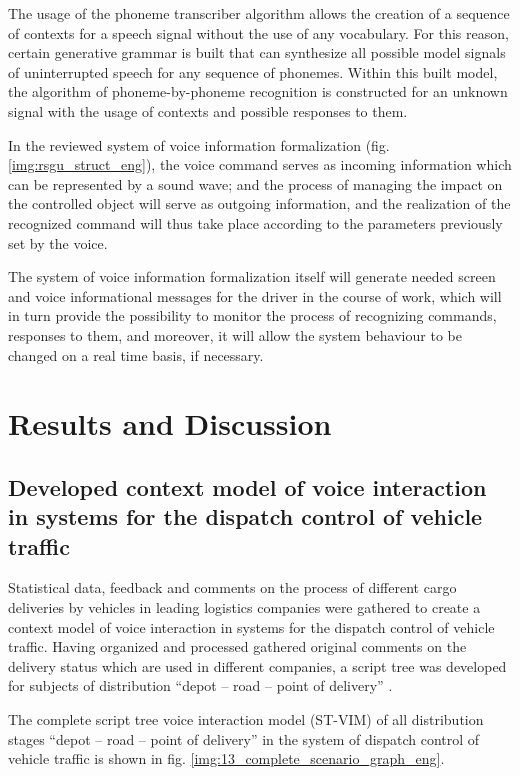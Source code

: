 \documentclass[review,authoryear]{elsarticle}
\begin{document}
The usage of the phoneme transcriber algorithm allows the creation of a sequence of contexts for a speech signal without the use of any vocabulary. For this reason, certain generative grammar is built that can synthesize all possible model signals of uninterrupted speech for any sequence of phonemes. Within this built model, the algorithm of phoneme-by-phoneme recognition is constructed for an unknown signal with the usage of contexts and possible responses to them. 

In the reviewed system of voice information formalization (fig. \ref{img:rsgu_struct_eng}), the voice command serves as incoming information which can be represented by a sound wave; and the process of managing the impact on the controlled object will serve as outgoing information, and the realization of the recognized command will thus take place according to the parameters previously set by the voice. 

The system of voice information formalization itself will generate needed screen and voice informational messages for the driver in the course of work, which will in turn provide the possibility to monitor the process of recognizing commands, responses to them, and moreover, it will allow the system behaviour to be changed on a real time basis, if necessary. 

\section{Results and Discussion} \label{sec:results}

\subsection{Developed context model of voice interaction in systems for the dispatch control of vehicle traffic} 

Statistical data, feedback and comments on the process of different cargo deliveries by vehicles in leading logistics companies were gathered to create a context model of voice interaction in systems for the dispatch control of vehicle traffic. Having organized and processed gathered original comments on the delivery status which are used in different companies, a script tree was developed for subjects of distribution “depot – road – point of delivery” \citep{eng_art3}. 

The complete script tree voice interaction model (ST-VIM) of all distribution stages “depot – road – point of delivery” in the system of dispatch control of vehicle traffic is shown in fig. \ref{img:13_complete_scenario_graph_eng}.
\end{document}

